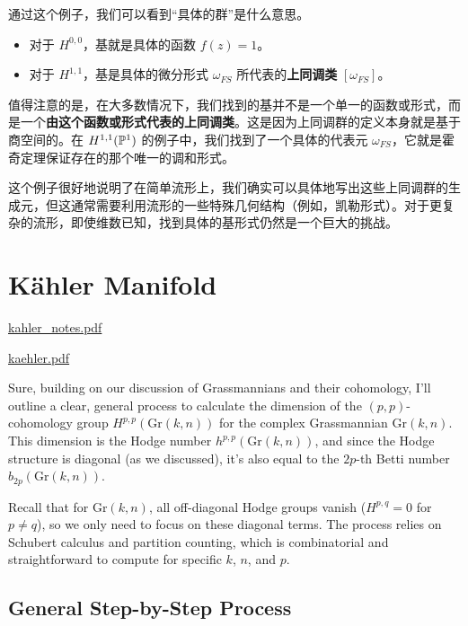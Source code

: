 \documentclass{amsart}
\let\originalmathbb\mathbb
\renewcommand{\mathbb}[1]{%
    \ifstrequal{#1}{1}{\mathbbm{#1}}{\originalmathbb{#1}}%
}
\theoremstyle{plain}
\theoremstyle{definition}
\theoremstyle{remark}
\begin{document}
通过这个例子，我们可以看到“具体的群”是什么意思。

\begin{itemize}
	\item 对于 $H^{0,0}$，基就是具体的函数 $f(z) = 1$。
	\item 对于 $H^{1,1}$，基是具体的微分形式 $\omega_{FS}$ 所代表的\textbf{上同调类} $[\omega_{FS}]$。
\end{itemize}

值得注意的是，在大多数情况下，我们找到的基并不是一个单一的函数或形式，而是一个\textbf{由这个函数或形式代表的上同调类}。这是因为上同调群的定义本身就是基于商空间的。在 $H^{1,1}(\mathbb{P}^1)$ 的例子中，我们找到了一个具体的代表元 $\omega_{FS}$，它就是霍奇定理保证存在的那个唯一的调和形式。

这个例子很好地说明了在简单流形上，我们确实可以具体地写出这些上同调群的生成元，但这通常需要利用流形的一些特殊几何结构（例如，凯勒形式）。对于更复杂的流形，即使维数已知，找到具体的基形式仍然是一个巨大的挑战。

\section{Kähler Manifold}

\href{https://math.uchicago.edu/~dannyc/notes/kahler_notes.pdf}{kahler\_notes.pdf}

\href{https://www.mathi.uni-heidelberg.de/~freitag/skripten/kaehler.pdf}{kaehler.pdf}

Sure, building on our discussion of Grassmannians and their cohomology, I'll outline a clear, general process to calculate the dimension of the $(p,p)$-cohomology group $H^{p,p}(\mathrm{Gr}(k,n))$ for the complex Grassmannian $\mathrm{Gr}(k,n)$. This dimension is the Hodge number $h^{p,p}(\mathrm{Gr}(k,n))$, and since the Hodge structure is diagonal (as we discussed), it's also equal to the $2p$-th Betti number $b_{2p}(\mathrm{Gr}(k,n))$.

Recall that for $\mathrm{Gr}(k,n)$, all off-diagonal Hodge groups vanish ($H^{p,q} = 0$ for $p \neq q$), so we only need to focus on these diagonal terms. The process relies on Schubert calculus and partition counting, which is combinatorial and straightforward to compute for specific $k$, $n$, and $p$.

\subsection{General Step-by-Step Process}
\end{document}
